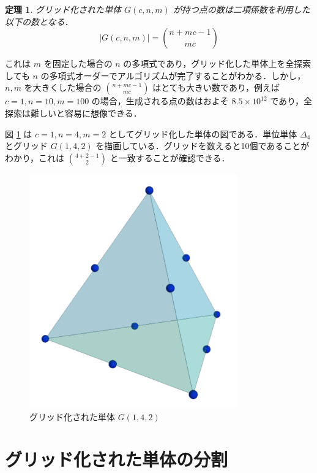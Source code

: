 \documentclass[a4paper,11pt]{jreport}
\newtheorem{theorem}{定理}
\begin{document}
\begin{theorem} \label{thm:n_grid}
グリッド化された単体 $ G(c, n, m) $ が持つ点の数は二項係数を利用した以下の数となる．
$$ | G(c, n, m) | = \binom{n + mc - 1}{mc} $$
\end{theorem}

これは $ m $ を固定した場合の $ n $ の多項式であり，グリッド化した単体上を全探索しても $ n $ の多項式オーダーでアルゴリズムが完了することがわかる．しかし，$ n, m $ を大きくした場合の $ \binom{n + mc - 1}{mc} $ はとても大きい数であり，例えば $ c = 1, n = 10, m = 100 $ の場合，生成される点の数はおよそ $ 8.5 \times 10^{12} $ であり，全探索は難しいと容易に想像できる．\par
図 \ref{fig:grid_simplex} は $ c=1, n=4, m=2 $ としてグリッド化した単体の図である．単位単体 $ \Delta_4 $ とグリッド $ G(1, 4, 2) $ を描画している．グリッドを数えると10個であることがわかり，これは $ \binom{4 + 2 - 1}{2} $ と一致することが確認できる．\par

\begin{figure}
\begin{center}
\includegraphics[width=9cm]{graphs/grid_simplex.pdf}
\caption{グリッド化された単体 $ G(1, 4, 2) $}
\label{fig:grid_simplex}
\end{center}
\end{figure}

\section{グリッド化された単体の分割} \label{sec:partition}
\end{document}
